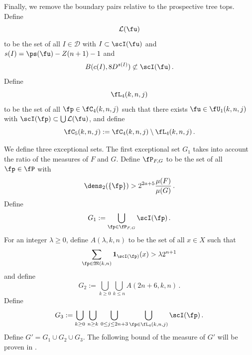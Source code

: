 Finally, we remove the boundary pairs relative to the prospective tree tops. Define
\begin{equation}
    \label{eq-L-def}
    \mathcal{L}(\fu)
\end{equation}
to be the set of all $I \in \mathcal{D}$ with $I \subset \scI(\fu)$ and $s(I) = \ps(\fu) - Z(n+1) - 1$ and
\begin{equation}
    B(c(I), 8 D^{s(I)})\not \subset \scI(\fu)\, .
\end{equation}
Define
\begin{equation}
    \label{eq-L4-def}
    \fL_4(k,n,j)
\end{equation}
to be the set of all $\fp\in \fC_4(k,n,j)$ such that there exists
$\fu\in \fU_1(k,n,j)$
with $\scI(\fp) \subset \bigcup \mathcal{L}(\fu)$, and define
\begin{equation}\label{defc5}
\fC_5(k,n,j):=\fC_4(k,n,j)
  \setminus \fL_4(k,n,j)\, .
\end{equation}


We define three exceptional sets.
The first exceptional set $G_1$ takes into account the ratio of the measures of $F$ and $G$.
Define $\fP_{F,G}$ to be the set of all $\fp\in \fP$
with
\begin{equation}
    \dens_2(\{\fp\})> 2^{2a+5}\frac{\mu(F)}{\mu(G)}\,.
\end{equation}
Define
\begin{equation}\label{definegone}
    G_1:=\bigcup_{\fp\in \fP_{F,G} }\scI(\fp)\, .
\end{equation}
For an integer $\lambda\ge 0$, define $A(\lambda,k,n)$ to be the set
of all $x\in X$ such that
\begin{equation}
    \label{eq-Aoverlap-def}
    \sum_{\fp \in \mathfrak{M}(k,n)}\mathbf{1}_{\scI(\fp)}(x)>\lambda 2^{n+1}
\end{equation}
and define
\begin{equation}\label{definegone2}
    G_2:=
\bigcup_{k\ge 0}\bigcup_{k\le n}
A(2n+6,k,n)\, .
\end{equation}
Define
    \begin{equation}\label{defineg3}
        G_3 :=
        \bigcup_{k\ge 0}\, \bigcup_{n \geq k}\,
        \bigcup_{0\le j\le 2n+3}
        \bigcup_{\fp \in \fL_4 (k,n,j)}
        \scI(\fp)\, .
     \end{equation}
Define $G'=G_1\cup G_2 \cup G_3$. The following bound of the measure of $G'$ will be proven in .

